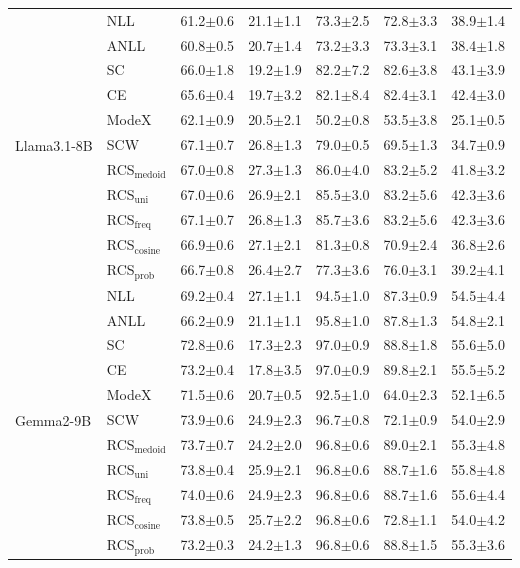 \begin{table}[t]
{\begin{tabular}{ll|ccccc}
    \multirow{11}{*}{Llama3.1-8B}
    & NLL & 61.2$\pm$0.6	&21.1$\pm$1.1&	73.3$\pm$2.5&	72.8$\pm$3.3&	38.9$\pm$1.4\\
    & ANLL & 60.8$\pm$0.5	&20.7$\pm$1.4	&73.2$\pm$3.3	&73.3$\pm$3.1&	38.4$\pm$1.8\\
    & SC  & 66.0$\pm$1.8	&19.2$\pm$1.9&	82.2$\pm$7.2&	82.6$\pm$3.8	&43.1$\pm$3.9\\
    & CE    & 65.6$\pm$0.4	&19.7$\pm$3.2	&82.1$\pm$8.4	&82.4$\pm$3.1	&42.4$\pm$3.0\\
    & ModeX    & 62.1$\pm$0.9	&20.5$\pm$2.1	&50.2$\pm$0.8	&53.5$\pm$3.8	&25.1$\pm$0.5\\
    & SCW & 67.1$\pm$0.7 & 26.8$\pm$1.3 & 79.0$\pm$0.5 & 69.5$\pm$1.3 & 34.7$\pm$0.9\\
    & RCS$_\text{medoid}$  &67.0$\pm$0.8	&27.3$\pm$1.3	&86.0$\pm$4.0	&83.2$\pm$5.2	&41.8$\pm$3.2\\
    & RCS$_\text{uni}$& 67.0$\pm$0.6	&26.9$\pm$2.1	&85.5$\pm$3.0	&83.2$\pm$5.6	&42.3$\pm$3.6\\
    &  RCS$_\text{freq}$&67.1$\pm$0.7	&26.8$\pm$1.3	&85.7$\pm$3.6	&83.2$\pm$5.6	&42.3$\pm$3.6\\
    & RCS$_\text{cosine}$ & 66.9$\pm$0.6 & 27.1$\pm$2.1 & 81.3$\pm$0.8 & 70.9$\pm$2.4 & 36.8$\pm$2.6\\
    &  RCS$_\text{prob}$  &66.7$\pm$0.8	&26.4$\pm$2.7	&77.3$\pm$3.6	&76.0$\pm$3.1	&39.2$\pm$4.1\\
    \midrule

    \multirow{11}{*}{Gemma2-9B}
    & NLL & 69.2$\pm$0.4	&27.1$\pm$1.1	&94.5$\pm$1.0	&87.3$\pm$0.9	&54.5$\pm$4.4\\
    & ANLL & 66.2$\pm$0.9	&21.1$\pm$1.1	&95.8$\pm$1.0	&87.8$\pm$1.3	&54.8$\pm$2.1\\
    & SC  & 72.8$\pm$0.6	&17.3$\pm$2.3	&97.0$\pm$0.9	&88.8$\pm$1.8	&55.6$\pm$5.0\\
    & CE    & 73.2$\pm$0.4	&17.8$\pm$3.5	&97.0$\pm$0.9&	89.8$\pm$2.1	&55.5$\pm$5.2\\
    & ModeX    & 71.5$\pm$0.6	&20.7$\pm$0.5	&92.5$\pm$1.0	&64.0$\pm$2.3	&52.1$\pm$6.5\\
    & SCW & 73.9$\pm$0.6 & 24.9$\pm$2.3 & 96.7$\pm$0.8 & 72.1$\pm$0.9 & 54.0$\pm$2.9\\

    & RCS$_\text{medoid}$  &73.7$\pm$0.7&	24.2$\pm$2.0&	96.8$\pm$0.6	&89.0$\pm$2.1&	55.3$\pm$4.8\\
    & RCS$_\text{uni}$& 73.8$\pm$0.4	&25.9$\pm$2.1	&96.8$\pm$0.6	&88.7$\pm$1.6	&55.8$\pm$4.8\\
    &  RCS$_\text{freq}$&74.0$\pm$0.6	&24.9$\pm$2.3	&96.8$\pm$0.6	&88.7$\pm$1.6	&55.6$\pm$4.4\\
    & RCS$_\text{cosine}$ & 73.8$\pm$0.5 & 25.7$\pm$2.2 & 96.8$\pm$0.6 & 72.8$\pm$1.1 & 54.0$\pm$4.2\\
    &  RCS$_\text{prob}$  &73.2$\pm$0.3	&24.2$\pm$1.3	&96.8$\pm$0.6&	88.8$\pm$1.5&	55.3$\pm$3.6\\
    
    \bottomrule
  \end{tabular}}
\end{table}

